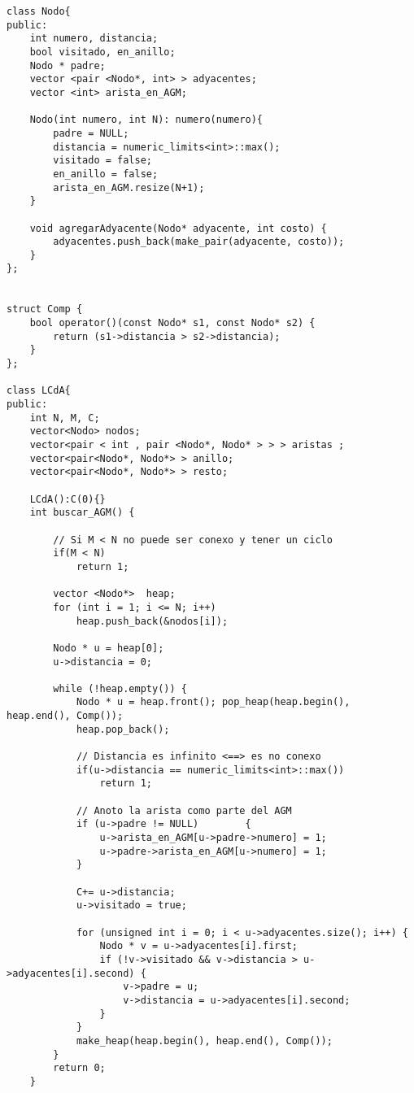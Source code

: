 \begin{frame}

\begin{lstlisting}
class Nodo{
public:
    int numero, distancia;
    bool visitado, en_anillo;
    Nodo * padre;
    vector <pair <Nodo*, int> > adyacentes;
    vector <int> arista_en_AGM;

    Nodo(int numero, int N): numero(numero){
        padre = NULL;
        distancia = numeric_limits<int>::max();
        visitado = false;
        en_anillo = false;
        arista_en_AGM.resize(N+1);
    }

    void agregarAdyacente(Nodo* adyacente, int costo) {
        adyacentes.push_back(make_pair(adyacente, costo));
    }
};


struct Comp {
    bool operator()(const Nodo* s1, const Nodo* s2) {
        return (s1->distancia > s2->distancia);
    }
};

class LCdA{
public:
	int N, M, C;
	vector<Nodo> nodos;
    vector<pair < int , pair <Nodo*, Nodo* > > > aristas ;
    vector<pair<Nodo*, Nodo*> > anillo;
    vector<pair<Nodo*, Nodo*> > resto;

	LCdA():C(0){}
	int buscar_AGM() {
    
        // Si M < N no puede ser conexo y tener un ciclo
        if(M < N)
            return 1;

        vector <Nodo*>  heap;
        for (int i = 1; i <= N; i++)
            heap.push_back(&nodos[i]);

        Nodo * u = heap[0];
        u->distancia = 0;

        while (!heap.empty()) {   
            Nodo * u = heap.front(); pop_heap(heap.begin(), heap.end(), Comp()); 
            heap.pop_back();

            // Distancia es infinito <==> es no conexo
            if(u->distancia == numeric_limits<int>::max())
                return 1;

            // Anoto la arista como parte del AGM
            if (u->padre != NULL)        {
                u->arista_en_AGM[u->padre->numero] = 1;
                u->padre->arista_en_AGM[u->numero] = 1;
            }

            C+= u->distancia;
            u->visitado = true;

            for (unsigned int i = 0; i < u->adyacentes.size(); i++) {
                Nodo * v = u->adyacentes[i].first;
                if (!v->visitado && v->distancia > u->adyacentes[i].second) {
                    v->padre = u;
                    v->distancia = u->adyacentes[i].second;
                }
            }
            make_heap(heap.begin(), heap.end(), Comp());
        }
        return 0;
    }


\end{lstlisting}
\end{frame}
